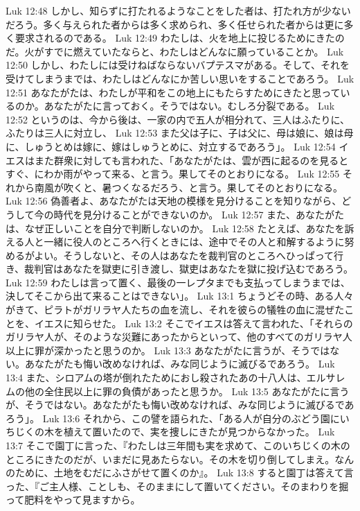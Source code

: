 Luk 12:48  しかし、知らずに打たれるようなことをした者は、打たれ方が少ないだろう。多く与えられた者からは多く求められ、多く任せられた者からは更に多く要求されるのである。
Luk 12:49  わたしは、火を地上に投じるためにきたのだ。火がすでに燃えていたならと、わたしはどんなに願っていることか。
Luk 12:50  しかし、わたしには受けねばならないバプテスマがある。そして、それを受けてしまうまでは、わたしはどんなにか苦しい思いをすることであろう。
Luk 12:51  あなたがたは、わたしが平和をこの地上にもたらすためにきたと思っているのか。あなたがたに言っておく。そうではない。むしろ分裂である。
Luk 12:52  というのは、今から後は、一家の内で五人が相分れて、三人はふたりに、ふたりは三人に対立し、
Luk 12:53  また父は子に、子は父に、母は娘に、娘は母に、しゅうとめは嫁に、嫁はしゅうとめに、対立するであろう」。
Luk 12:54  イエスはまた群衆に対しても言われた、「あなたがたは、雲が西に起るのを見るとすぐ、にわか雨がやって来る、と言う。果してそのとおりになる。
Luk 12:55  それから南風が吹くと、暑つくなるだろう、と言う。果してそのとおりになる。
Luk 12:56  偽善者よ、あなたがたは天地の模様を見分けることを知りながら、どうして今の時代を見分けることができないのか。
Luk 12:57  また、あなたがたは、なぜ正しいことを自分で判断しないのか。
Luk 12:58  たとえば、あなたを訴える人と一緒に役人のところへ行くときには、途中でその人と和解するように努めるがよい。そうしないと、その人はあなたを裁判官のところへひっぱって行き、裁判官はあなたを獄吏に引き渡し、獄吏はあなたを獄に投げ込むであろう。
Luk 12:59  わたしは言って置く、最後の一レプタまでも支払ってしまうまでは、決してそこから出て来ることはできない」。
Luk 13:1  ちょうどその時、ある人々がきて、ピラトがガリラヤ人たちの血を流し、それを彼らの犠牲の血に混ぜたことを、イエスに知らせた。
Luk 13:2  そこでイエスは答えて言われた、「それらのガリラヤ人が、そのような災難にあったからといって、他のすべてのガリラヤ人以上に罪が深かったと思うのか。
Luk 13:3  あなたがたに言うが、そうではない。あなたがたも悔い改めなければ、みな同じように滅びるであろう。
Luk 13:4  また、シロアムの塔が倒れたためにおし殺されたあの十八人は、エルサレムの他の全住民以上に罪の負債があったと思うか。
Luk 13:5  あなたがたに言うが、そうではない。あなたがたも悔い改めなければ、みな同じように滅びるであろう」。
Luk 13:6  それから、この譬を語られた、「ある人が自分のぶどう園にいちじくの木を植えて置いたので、実を捜しにきたが見つからなかった。
Luk 13:7  そこで園丁に言った、『わたしは三年間も実を求めて、このいちじくの木のところにきたのだが、いまだに見あたらない。その木を切り倒してしまえ。なんのために、土地をむだにふさがせて置くのか』。
Luk 13:8  すると園丁は答えて言った、『ご主人様、ことしも、そのままにして置いてください。そのまわりを掘って肥料をやって見ますから。
